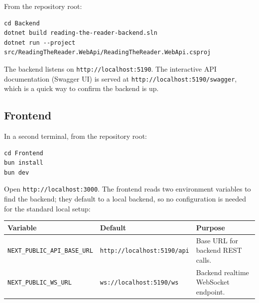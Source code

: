 From the repository root:

\begin{Verbatim}[breaklines=true,breakanywhere=true,fontsize=\small]
cd Backend
dotnet build reading-the-reader-backend.sln
dotnet run --project src/ReadingTheReader.WebApi/ReadingTheReader.WebApi.csproj
\end{Verbatim}

The backend listens on \texttt{http://localhost:5190}. The interactive API documentation (Swagger UI) is
served at \texttt{http://localhost:5190/swagger}, which is a quick way to confirm the backend is up.

\subsection{Frontend}\label{52-frontend}

In a second terminal, from the repository root:

\begin{Verbatim}[breaklines=true,breakanywhere=true,fontsize=\small]
cd Frontend
bun install
bun dev
\end{Verbatim}

Open \texttt{http://localhost:3000}. The frontend reads two environment variables to find the backend;
they default to a local backend, so no configuration is needed for the standard local setup:

{\small{} %
\begin{longtable}[]{@{}
  >{\raggedright\arraybackslash}p{}
  >{\raggedright\arraybackslash}p{}
  >{\raggedright\arraybackslash}p{}@{}}
\toprule\noalign{}
\begin{minipage}[b]{\linewidth}\raggedright
Variable
\end{minipage} & \begin{minipage}[b]{\linewidth}\raggedright
Default
\end{minipage} & \begin{minipage}[b]{\linewidth}\raggedright
Purpose
\end{minipage} \\
\midrule\noalign{}
\endhead
\bottomrule\noalign{}
\endlastfoot
\texttt{NEXT\_PUBLIC\_API\_BASE\_URL} & \texttt{http://localhost:5190/api} & Base URL for backend REST calls. \\
\texttt{NEXT\_PUBLIC\_WS\_URL} & \texttt{ws://localhost:5190/ws} & Backend realtime WebSocket endpoint. \\
\end{longtable}
}

